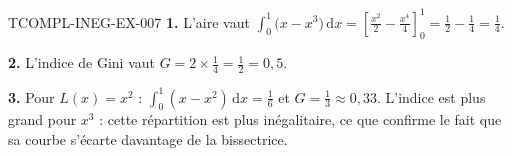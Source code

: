 \begin{corrige}{TCOMPL-INEG-EX-007}
\textbf{1.} L'aire vaut
$\displaystyle\int_0^1\big(x-x^3\big)\,\mathrm{d}x
=\left[\tfrac{x^2}{2}-\tfrac{x^4}{4}\right]_0^1=\tfrac12-\tfrac14=\tfrac14$.

\textbf{2.} L'indice de Gini vaut $G=2\times\tfrac14=\tfrac12=0{,}5$.

\textbf{3.} Pour $L(x)=x^2$ : $\int_0^1(x-x^2)\,\mathrm{d}x=\tfrac16$ et
$G=\tfrac13\approx0{,}33$. L'indice est plus grand pour $x^3$ : cette
répartition est plus inégalitaire, ce que confirme le fait que sa courbe
s'écarte davantage de la bissectrice.
\end{corrige}
